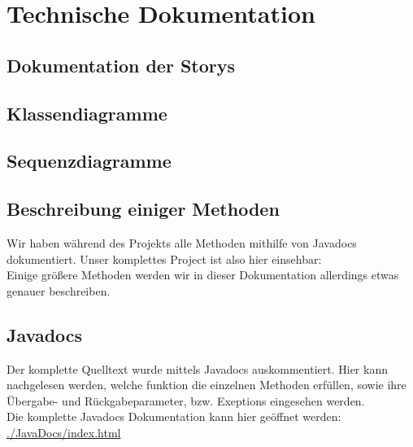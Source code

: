 \section{Technische Dokumentation}
\subsection{Dokumentation der Storys}
\subsection{Klassendiagramme}
\subsection{Sequenzdiagramme}


\subsection{Beschreibung einiger Methoden}
Wir haben während des Projekts alle Methoden mithilfe von Javadocs dokumentiert. Unser komplettes 
Project ist also hier einsehbar: %
\\

Einige größere Methoden werden wir in dieser Dokumentation allerdings etwas genauer beschreiben.

\subsection{Javadocs}
Der komplette Quelltext wurde mittels Javadocs auskommentiert. Hier kann nachgelesen werden, welche 
funktion die einzelnen Methoden erfüllen, sowie ihre Übergabe- und Rückgabeparameter, bzw. 
Exeptions  eingesehen werden.\\
Die komplette Javadocs Dokumentation kann hier geöffnet werden:\\
\url{./JavaDocs/index.html}